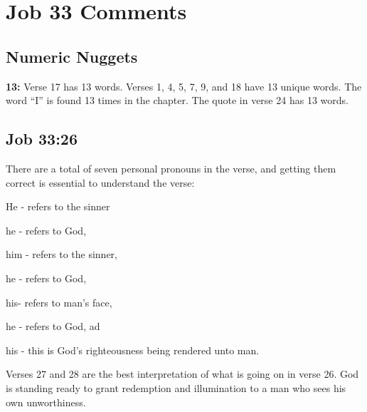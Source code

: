 \section{Job 33  Comments}

\subsection{Numeric Nuggets}
\textbf{13:} Verse 17 has 13 words. Verses 1, 4, 5, 7, 9, and 18 have 13 unique words. The word ``I'' is found 13 times in the chapter.  The quote in verse 24 has 13 words.

\subsection{Job 33:26}
There are a total of seven personal pronouns in the verse, and getting them correct is essential to understand the verse:
\begin{compactenum}
    \item He - refers to the sinner
    \item he - refers to God,
    \item him - refers to the sinner, 
    \item he - refers to God,
    \item his- refers to man's face,
    \item he - refers to God, ad
    \item his - this is God's righteousness being rendered unto man.
\end{compactenum}

Verses 27 and 28 are the best interpretation of what is going on in verse 26.  God is standing ready to grant redemption and illumination to a man who sees his own unworthiness.